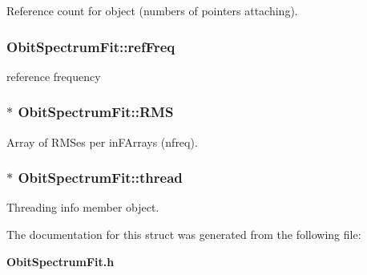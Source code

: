 Reference count for object (numbers of pointers attaching). 

\subsubsection{ {\bf Obit\-Spectrum\-Fit::ref\-Freq}}\label{structObitSpectrumFit_o19}


reference frequency 

\subsubsection{$\ast$ {\bf Obit\-Spectrum\-Fit::RMS}}\label{structObitSpectrumFit_o17}


Array of RMSes per in\-FArrays (nfreq). 

\subsubsection{$\ast$ {\bf Obit\-Spectrum\-Fit::thread}}\label{structObitSpectrumFit_o4}


Threading info member object. 



The documentation for this struct was generated from the following file:\begin{CompactItemize}
\item 
{\bf Obit\-Spectrum\-Fit.h}\end{CompactItemize}
